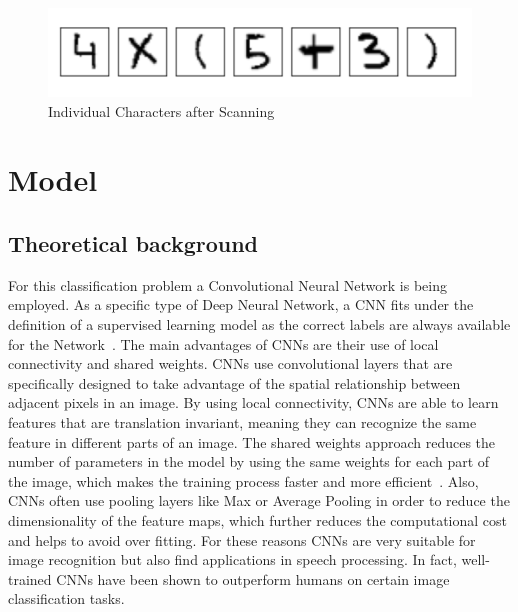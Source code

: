 \documentclass[@CLASSOPTIONS@]{tumarticle}
\begin{document}
\begin{figure}
    \begin{minipage}{0.48\textwidth}
     \centering
     \includegraphics[width=.9\linewidth]{figures/real_data_3}
     \caption{Individual Characters after Scanning}\label{Fig:Data6}
   \end{minipage}
\end{figure}

\section{Model}
\label{sec:implementation}


\subsection{Theoretical background}

For this classification problem a Convolutional Neural Network is being employed.
As a specific type of Deep Neural Network, a CNN fits under the definition of a supervised learning model as the correct
labels are always available for the Network~\cite[p.~9]{reviewDL}.
The main advantages of CNNs are their use of local connectivity and shared weights.
CNNs use convolutional layers that are specifically designed to take advantage of the spatial relationship between
adjacent pixels in an image.
By using local connectivity, CNNs are able to learn features that are translation invariant, meaning they can
recognize the same feature in different parts of an image.
The shared weights approach reduces the number of parameters in the model by using the same weights for each part of the
image, which makes the training process faster and more efficient~\cite[p.~13-14]{reviewDL}.
Also, CNNs often use pooling layers like Max or Average Pooling in order to reduce the dimensionality of the feature maps,
which further reduces the computational cost and helps to avoid over fitting.
For these reasons CNNs are very suitable for image recognition but also find applications in speech
processing.
In fact, well-trained CNNs have been shown to outperform humans on certain image classification tasks.
\end{document}
